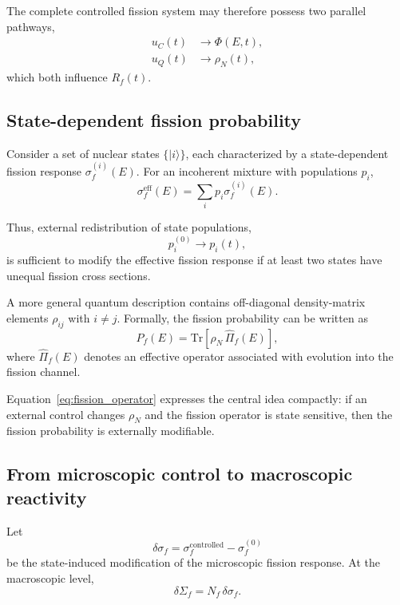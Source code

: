 The complete controlled fission system may therefore possess two parallel pathways,
\begin{align}
u_C(t) &\longrightarrow \Phi(E,t),\\
u_Q(t) &\longrightarrow \rho_N(t),
\end{align}
which both influence $R_f(t)$.

\subsection{State-dependent fission probability}

Consider a set of nuclear states $\{|i\rangle\}$, each characterized by a state-dependent fission response $\sigma_f^{(i)}(E)$. For an incoherent mixture with populations $p_i$,
\begin{equation}
\sigma_f^{\mathrm{eff}}(E)
=
\sum_i
p_i
\sigma_f^{(i)}(E).
\label{eq:incoherent_sigma}
\end{equation}

Thus, external redistribution of state populations,
\begin{equation}
p_i^{(0)}
\rightarrow
p_i(t),
\end{equation}
is sufficient to modify the effective fission response if at least two states have unequal fission cross sections.

A more general quantum description contains off-diagonal density-matrix elements $\rho_{ij}$ with $i\neq j$. Formally, the fission probability can be written as
\begin{equation}
P_f(E)
=
\mathrm{Tr}
\left[
\rho_N\,
\hat{\Pi}_f(E)
\right],
\label{eq:fission_operator}
\end{equation}
where $\hat{\Pi}_f(E)$ denotes an effective operator associated with evolution into the fission channel.

Equation~\eqref{eq:fission_operator} expresses the central idea compactly: if an external control changes $\rho_N$ and the fission operator is state sensitive, then the fission probability is externally modifiable.

\subsection{From microscopic control to macroscopic reactivity}

Let
\begin{equation}
\delta\sigma_f
=
\sigma_f^{\mathrm{controlled}}
-
\sigma_f^{(0)}
\end{equation}
be the state-induced modification of the microscopic fission response. At the macroscopic level,
\begin{equation}
\delta\Sigma_f
=
N_f\,\delta\sigma_f.
\end{equation}

